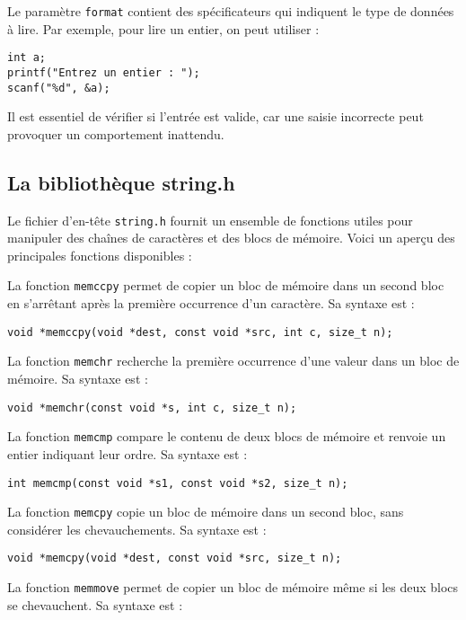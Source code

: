 \documentclass[french,11pt]{article}
\begin{document}
Le paramètre \texttt{format} contient des spécificateurs qui indiquent le type de données à lire. Par exemple, pour lire un entier, on peut utiliser :

\begin{verbatim}
int a;
printf("Entrez un entier : ");
scanf("%d", &a);
\end{verbatim}

Il est essentiel de vérifier si l'entrée est valide, car une saisie incorrecte peut provoquer un comportement inattendu. 

\subsection{La bibliothèque string.h}
Le fichier d'en-tête \texttt{string.h} fournit un ensemble de fonctions utiles pour manipuler des chaînes de caractères et des blocs de mémoire. Voici un aperçu des principales fonctions disponibles :

La fonction \texttt{memccpy} permet de copier un bloc de mémoire dans un second bloc en s'arrêtant après la première occurrence d'un caractère. Sa syntaxe est :

\begin{verbatim}
void *memccpy(void *dest, const void *src, int c, size_t n);
\end{verbatim}

La fonction \texttt{memchr} recherche la première occurrence d'une valeur dans un bloc de mémoire. Sa syntaxe est :

\begin{verbatim}
void *memchr(const void *s, int c, size_t n);
\end{verbatim}

La fonction \texttt{memcmp} compare le contenu de deux blocs de mémoire et renvoie un entier indiquant leur ordre. Sa syntaxe est :

\begin{verbatim}
int memcmp(const void *s1, const void *s2, size_t n);
\end{verbatim}

La fonction \texttt{memcpy} copie un bloc de mémoire dans un second bloc, sans considérer les chevauchements. Sa syntaxe est :

\begin{verbatim}
void *memcpy(void *dest, const void *src, size_t n);
\end{verbatim}

La fonction \texttt{memmove} permet de copier un bloc de mémoire même si les deux blocs se chevauchent. Sa syntaxe est :
\end{document}
